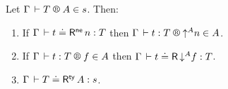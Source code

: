 \documentclass[acmlarge,review,anonymous]{acmart}\settopmatter{printfolios=true}
\begin{document}

\begin{theorem}
\label{thm:into}
\bla
Let $\LRTS{\Gamma} T A s$. Then:
\begin{enumerate}

\item \label{it:into}
   If\/ $\Gamma \,\vdash t \doteq \mathsf{R}^{\mathsf{ne}}\,n : T$ then
   $\LR \Gamma t T {\up A n} A$.

\item \label{it:out}
  If\/ $\LR \Gamma t T f A$ then
  $\Gamma \,\vdash t \doteq \mathsf{R}\,\mathord{\downarrow^{A}} f : T$.

\item \label{it:outty}
   $\Gamma \,\vdash T \doteq \mathsf{R}^{\mathsf{ty}}\,A : s$.




\end{enumerate}
\end{theorem}
\end{document}
